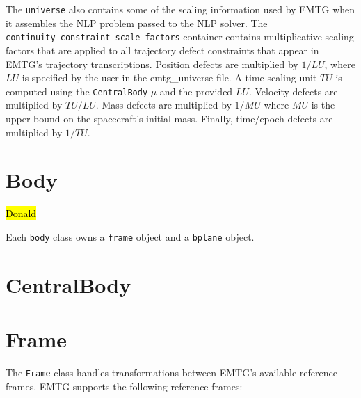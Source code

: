 The \texttt{universe} also contains some of the scaling information used by EMTG when it assembles the NLP problem passed to the NLP solver. The \texttt{continuity\_constraint\_scale\_factors} container contains multiplicative scaling factors that are applied to all trajectory defect constraints that appear in EMTG's trajectory transcriptions. Position defects are multiplied by $1/LU$, where $LU$ is specified by the user in the emtg\_universe file. A time scaling unit $TU$ is computed using the \texttt{CentralBody} $\mu$ and the provided $LU$. Velocity defects are multiplied by $TU/LU$. Mass defects are multiplied by $1/MU$ where $MU$ is the upper bound on the spacecraft's initial mass. Finally, time/epoch defects are multiplied by $1/TU$.


\section{Body}
\label{sec:body}

\hl{Donald}

Each \texttt{body} class owns a \texttt{frame} object and a \texttt{bplane} object.

\section{CentralBody}
\label{sec:central_body}



\section{Frame}
\label{sec:frame}

The \texttt{Frame} class handles transformations between EMTG's available reference frames. EMTG supports the following reference frames:

